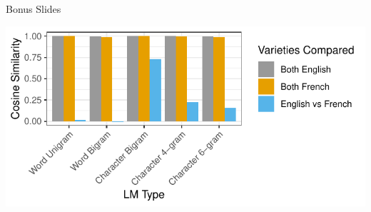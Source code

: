 \documentclass{beamer}\usepackage[]{graphicx}\usepackage[]{color}
\makeatletter
\def\maxwidth{ %
  \ifdim\Gin@nat@width>\linewidth
    \linewidth
  \else
    \Gin@nat@width
  \fi
}
\makeatother
\begin{document}
    \begin{frame}{Bonus Slides}
      \begin{center}

\includegraphics[width=\maxwidth]{figure/graphCosSimlinglevs-1} 

      \end{center}
    \end{frame}
\end{document}
